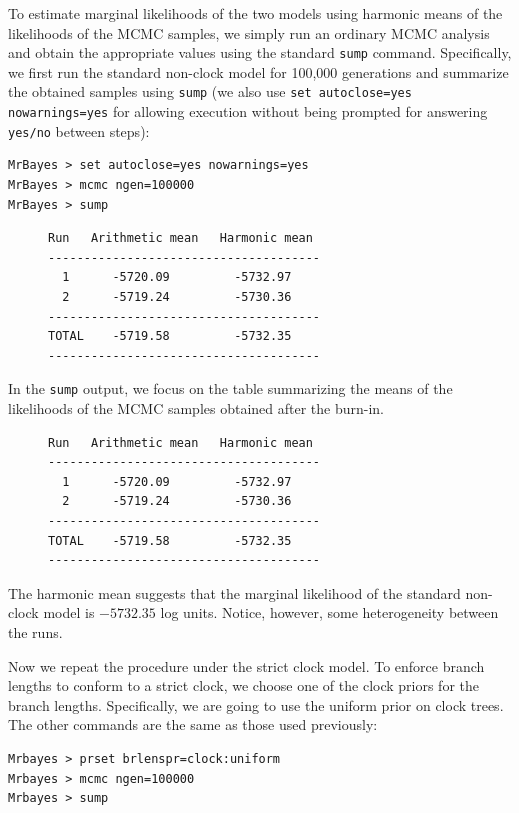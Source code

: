 \documentclass[12pt]{book}
\begin{document}
To estimate marginal likelihoods of the two models using harmonic means of the likelihoods of the
MCMC samples, we simply run an ordinary MCMC analysis and obtain the appropriate values using the
standard \texttt{sump} command. Specifically, we first run the standard non-clock model for 100,000
generations and summarize the obtained samples using \texttt{sump} (we also use \texttt{set
autoclose=yes nowarnings=yes} for allowing execution without being prompted for answering
\texttt{yes/no} between steps):

\begin{Verbatim}
MrBayes > set autoclose=yes nowarnings=yes
MrBayes > mcmc ngen=100000
MrBayes > sump
\end{Verbatim}

\begin{figure}[h]
\centering
\begin{BVerbatim}
Run   Arithmetic mean   Harmonic mean
--------------------------------------
  1      -5720.09         -5732.97
  2      -5719.24         -5730.36
--------------------------------------
TOTAL    -5719.58         -5732.35
--------------------------------------
\end{BVerbatim}
\end{figure}

In the \texttt{sump} output, we focus on the table summarizing the means of the likelihoods of the
MCMC samples obtained after the burn-in.

\begin{figure}[h]
\centering
\begin{BVerbatim}
Run   Arithmetic mean   Harmonic mean
--------------------------------------
  1      -5720.09         -5732.97
  2      -5719.24         -5730.36
--------------------------------------
TOTAL    -5719.58         -5732.35
--------------------------------------
\end{BVerbatim}
\end{figure}

The harmonic mean suggests that the marginal likelihood of the standard non-clock model is
$-5732.35$ log units. Notice, however, some heterogeneity between the runs.

Now we repeat the procedure under the strict clock model. To enforce branch lengths to conform to a
strict clock, we choose one of the clock priors for the branch lengths. Specifically, we are going
to use the uniform prior on clock trees. The other commands are the same as those used previously:

\begin{Verbatim}
Mrbayes > prset brlenspr=clock:uniform
Mrbayes > mcmc ngen=100000
Mrbayes > sump
\end{Verbatim}
\end{document}

